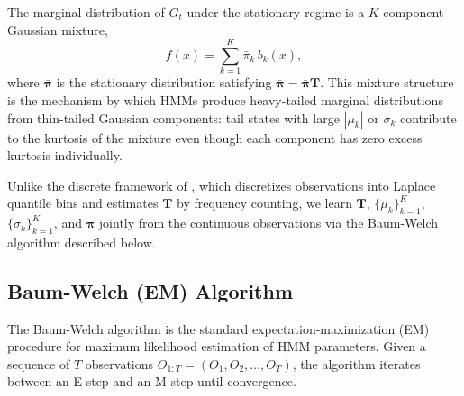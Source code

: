 The marginal distribution of $G_t$ under the stationary regime is a $K$-component Gaussian mixture,
\begin{equation}
    f(x) = \sum_{k=1}^{K} \bar{\pi}_k \, b_k(x),
    \label{eq:mixture}
\end{equation}
where $\bar{\boldsymbol{\pi}}$ is the stationary distribution satisfying $\bar{\boldsymbol{\pi}} = \bar{\boldsymbol{\pi}} \mathbf{T}$.
This mixture structure is the mechanism by which HMMs produce heavy-tailed marginal distributions from thin-tailed Gaussian components: tail states with large $|\mu_k|$ or $\sigma_k$ contribute to the kurtosis of the mixture even though each component has zero excess kurtosis individually.

Unlike the discrete framework of \citet{alswaidan2026hybrid}, which discretizes observations into Laplace quantile bins and estimates $\mathbf{T}$ by frequency counting, we learn $\mathbf{T}$, $\{\mu_k\}_{k=1}^{K}$, $\{\sigma_k\}_{k=1}^{K}$, and $\boldsymbol{\pi}$ jointly from the continuous observations via the Baum-Welch algorithm described below.

\subsection{Baum-Welch (EM) Algorithm}
\label{sec:baum_welch}

The Baum-Welch algorithm \cite{baum1970maximization} is the standard expectation-maximization (EM) procedure for maximum likelihood estimation of HMM parameters.
Given a sequence of $T$ observations $O_{1:T} = (O_1, O_2, \ldots, O_T)$, the algorithm iterates between an E-step and an M-step until convergence.

